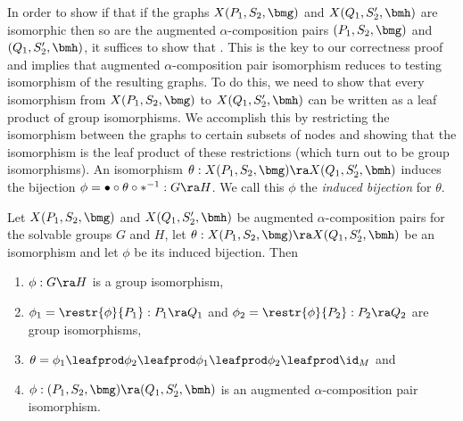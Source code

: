 In order to show if that if the graphs $X(P_1, S_2, \bmg)$ and $X(Q_1, S_2', \bmh)$ are isomorphic then so are the augmented $\alpha$-composition pairs $(P_1, S_2, \bmg)$ and $(Q_1, S_2', \bmh)$, it suffices to show that .  This is the key to our correctness proof and implies that augmented $\alpha$-composition pair isomorphism reduces to testing isomorphism of the resulting graphs. To do this, we need to show that every isomorphism from $X(P_1, S_2, \bmg)$ to $X(Q_1, S_2', \bmh)$ can be written as a leaf product of group isomorphisms.  We accomplish this by restricting the isomorphism between the graphs to certain subsets of nodes and showing that the isomorphism is the leaf product of these restrictions (which turn out to be group isomorphisms).  An isomorphism $\theta : X(P_1, S_2, \bmg) \ra X(Q_1, S_2', \bmh)$ induces the bijection $\phi = \bullet \circ \theta \circ *^{-1} : G \ra H$.  We call this $\phi$ the \emph{induced bijection} for $\theta$.

\begin{lemma}
  \label{lem:iso-decomp}
  Let $X(P_1, S_2, \bmg)$ and $X(Q_1, S_2', \bmh)$ be augmented $\alpha$-composition pairs for the solvable groups $G$ and $H$, let $\theta : X(P_1, S_2, \bmg) \ra X(Q_1, S_2', \bmh)$ be an isomorphism and let $\phi$ be its induced bijection.  Then



  \begin{enumerate}
  \item $\phi : G \ra H$ is a group isomorphism,
  \item $\phi_1 = \restr{\phi}{P_1} : P_1 \ra Q_1$ and $\phi_2 = \restr{\phi}{P_2} : P_2 \ra Q_2$ are group isomorphisms,
  \item $\theta = \phi_1 \leafprod \phi_2 \leafprod \phi_1 \leafprod \phi_2 \leafprod \id_M$ and
  \item $\phi : (P_1, S_2, \bmg) \ra (Q_1, S_2', \bmh)$ is an augmented $\alpha$-composition pair isomorphism.
  \end{enumerate}
\end{lemma}

